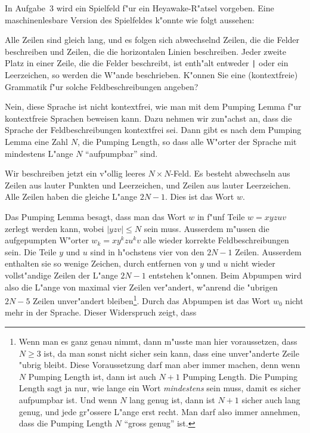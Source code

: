 In Aufgabe~3 wird ein Spielfeld f"ur ein Heyawake-R"atsel vorgeben.
Eine maschinenlesbare Version des Spielfeldes k"onnte wie 
folgt aussehen:
\begin{center}
\small
{}
\end{center}
Alle Zeilen sind gleich lang, und es folgen sich abwechselnd Zeilen,
die die Felder beschreiben und Zeilen, die die horizontalen Linien
beschreiben.
Jeder zweite Platz in einer Zeile, die die Felder beschreibt, ist
enth"alt entweder \texttt{|} oder ein Leerzeichen, so werden die W"ande
beschrieben.
K"onnen Sie eine (kontextfreie) Grammatik f"ur solche Feldbeschreibungen
angeben?

\begin{loesung}
Nein, diese Sprache ist nicht kontextfrei, wie man mit dem 
Pumping Lemma f"ur kontextfreie Sprachen beweisen kann.
Dazu nehmen wir zun"achst an, dass die Sprache der Feldbeschreibungen
kontextfrei sei. Dann gibt es nach dem Pumping Lemma eine Zahl $N$,
die Pumping Length, so dass alle W"orter der Sprache mit mindestens
L"ange $N$ ``aufpumpbar'' sind.

Wir beschreiben jetzt ein v"ollig leeres $N\times N$-Feld. Es besteht
abwechseln aus Zeilen aus lauter Punkten und Leerzeichen, und Zeilen
aus lauter Leerzeichen. Alle Zeilen haben die gleiche L"ange $2N-1$.
Dies ist das Wort $w$.

Das Pumping Lemma besagt, dass man das Wort  $w$ in f"unf Teile
$w=xyzuv$ zerlegt werden kann, wobei $|yzv|\le N$ sein muss.
Ausserdem m"ussen die aufgepumpten W"orter $w_k=xy^kzu^kv$ alle wieder
korrekte Feldbeschreibungen sein.
Die Teile $y$ und $u$ sind in h"ochstens vier von den $2N-1$ Zeilen.
Ausserdem enthalten sie so wenige Zeichen, durch entfernen von
$y$ und $u$ nicht wieder vollst"andige Zeilen der L"ange $2N-1$ entstehen
k"onnen.
Beim Abpumpen wird also die L"ange von maximal vier Zeilen ver"andert,
w"anrend die "ubrigen $2N-5$ Zeilen unver"andert bleiben\footnote{Wenn man
es ganz genau nimmt, dann m"usste man hier voraussetzen, dass $N \ge 3$ ist,
da man sonst nicht sicher sein kann, dass eine unver"anderte Zeile
"ubrig bleibt. Diese Voraussetzung darf man aber immer machen, denn
wenn $N$ Pumping Length ist, dann ist auch $N+1$ Pumping Length.
Die Pumping Length sagt ja nur, wie lange ein Wort {\em mindestens} sein
muss, damit es sicher aufpumpbar ist. Und wenn $N$ lang genug ist, dann ist
$N+1$ sicher auch lang genug, und jede gr"ossere L"ange erst recht.
Man darf also immer annehmen, dass die Pumping Length $N$ ``gross genug'' ist.}.
Durch das Abpumpen ist das Wort $w_0$ nicht mehr in der Sprache.
Dieser Widerspruch zeigt, dass 
\end{loesung}

